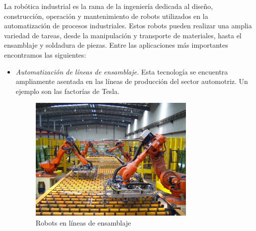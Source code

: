 La robótica industrial es la rama de la ingeniería dedicada al diseño, construcción, operación y mantenimiento 
de robots utilizados en la automatización de procesos industriales. Estos robots pueden realizar una amplia variedad 
de tareas, desde la manipulación y transporte de materiales, hasta el ensamblaje y soldadura de piezas. Entre las aplicaciones 
más importantes encontramos las siguientes:

\begin{itemize}
  \item \textit{Automatización de líneas de ensamblaje.} Esta tecnología se encuentra ampliamente asentada en las líneas de  producción 
                                                        del sector automotriz. Un ejemplo son las factorías de Tesla.  
  \begin{figure} [h!]
    \begin{center}
      \includegraphics[width=8cm]{figs/industrial_robot.jpg}
    \end{center}
    \caption{Robots en líneas de ensamblaje}
    \label{fig:robIndustrialChain}
  \end{figure}\   


\end{itemize}
